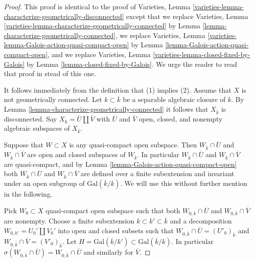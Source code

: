 \begin{proof}
This proof is identical to the proof of
Varieties, Lemma \ref{varieties-lemma-characterize-geometrically-disconnected}
except that
we replace
Varieties, Lemma \ref{varieties-lemma-characterize-geometrically-connected}
by Lemma \ref{lemma-characterize-geometrically-connected},
we replace
Varieties, Lemma \ref{varieties-lemma-Galois-action-quasi-compact-open}
by Lemma \ref{lemma-Galois-action-quasi-compact-open}, and
we replace
Varieties, Lemma \ref{varieties-lemma-closed-fixed-by-Galois}
by Lemma \ref{lemma-closed-fixed-by-Galois}.
We urge the reader to read that proof in stead of this one.

\medskip\noindent
It follows immediately from the definition that (1) implies (2).
Assume that $X$ is not geometrically connected.
Let $k \subset \overline{k}$ be a separable algebraic
closure of $k$. By
Lemma \ref{lemma-characterize-geometrically-connected}
it follows that $X_{\overline{k}}$ is disconnected.
Say $X_{\overline{k}} = \overline{U} \amalg \overline{V}$
with $\overline{U}$ and $\overline{V}$ open, closed, and nonempty
algebraic subspaces of $X_{\overline{k}}$.

\medskip\noindent
Suppose that $W \subset X$ is any quasi-compact open subspace.
Then $W_{\overline{k}} \cap \overline{U}$ and
$W_{\overline{k}} \cap \overline{V}$ are open and closed subspaces of
$W_{\overline{k}}$. In particular $W_{\overline{k}} \cap \overline{U}$ and
$W_{\overline{k}} \cap \overline{V}$ are quasi-compact, and by
Lemma \ref{lemma-Galois-action-quasi-compact-open}
both $W_{\overline{k}} \cap \overline{U}$ and
$W_{\overline{k}} \cap \overline{V}$
are defined over a finite subextension and invariant under an
open subgroup of $\text{Gal}(\overline{k}/k)$.
We will use this without further mention in the following.

\medskip\noindent
Pick $W_0 \subset X$ quasi-compact open subspace such that both
$W_{0, \overline{k}} \cap \overline{U}$ and
$W_{0, \overline{k}} \cap \overline{V}$ are nonempty.
Choose a finite subextension $k \subset k' \subset \overline{k}$
and a decomposition $W_{0, k'} = U_0' \amalg V_0'$ into open and closed
subsets such that
$W_{0, \overline{k}} \cap \overline{U} = (U'_0)_{\overline{k}}$ and
$W_{0, \overline{k}} \cap \overline{V} = (V'_0)_{\overline{k}}$.
Let $H = \text{Gal}(\overline{k}/k') \subset \text{Gal}(\overline{k}/k)$.
In particular
$\sigma(W_{0, \overline{k}} \cap \overline{U}) =
W_{0, \overline{k}} \cap \overline{U}$ and similarly for
$\overline{V}$.


\end{proof}
